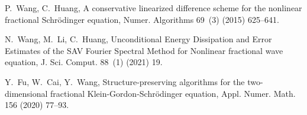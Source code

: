 \documentclass[preprint,compress,3p,10pt,fleqn]{elsarticle}
\numberwithin{equation}{section}
\begin{document}
\begin{thebibliography}{10}
	P.~Wang, C.~Huang, A conservative linearized difference scheme for the nonlinear fractional
	  Schr\"odinger equation, Numer. Algorithms 69~(3) (2015) 625--641.

	N.~Wang, M.~Li, C.~Huang, Unconditional Energy Dissipation and Error Estimates of the SAV Fourier Spectral
	  Method for Nonlinear fractional  wave equation, J. Sci. Comput. 88~(1) (2021) 19.

	Y.~Fu, W.~Cai, Y.~Wang, Structure-preserving
	  algorithms for the two-dimensional fractional Klein-Gordon-Schr\"odinger
	  equation, Appl. Numer. Math. 156 (2020) 77--93.

	\end{thebibliography}
	
	

% 
% 
\end{document}
